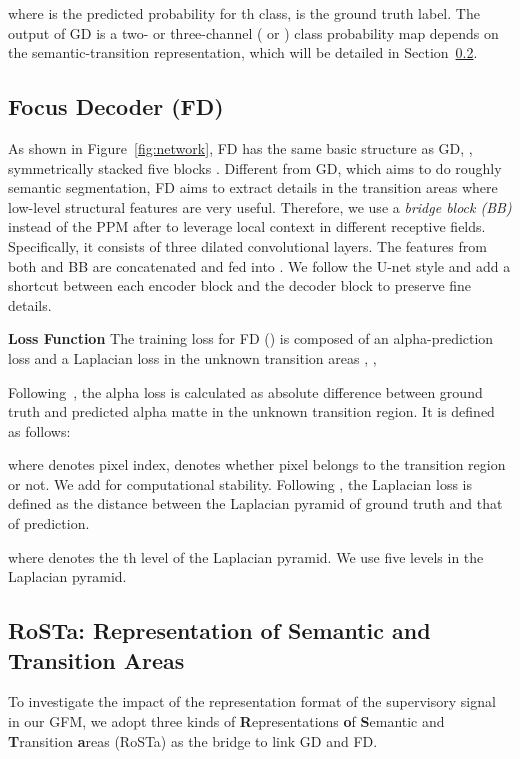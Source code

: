 \documentclass[twocolumn]{svjour3}
\begin{document}
where  is the predicted probability for th class,  is the ground truth label. The output of GD is a two- or three-channel ( or ) class probability map depends on the semantic-transition representation, which will be detailed in Section~\ref{section:data_presentation}.

\subsection{Focus Decoder (FD)}
As shown in Figure~\ref{fig:network}, FD has the same basic structure as GD, , symmetrically stacked five blocks . Different from GD, which aims to do roughly semantic segmentation, FD aims to extract details in the transition areas where low-level structural features are very useful. Therefore, we use a \textit{bridge block (BB)} \citep{Qin_2019_CVPR} instead of the PPM after  to leverage local context in different receptive fields. Specifically, it consists of three dilated convolutional layers. The features from both  and BB are concatenated and fed into . We follow the U-net \citep{ronneberger2015u} style and add a shortcut between each encoder block  and the decoder block  to preserve fine details.

\textbf{Loss Function} The training loss for FD () is composed of an alpha-prediction loss  and a Laplacian loss  in the unknown transition areas \citep{hou2019context}, ,

Following~\citep{xu2017deep}, the alpha loss  is calculated as absolute difference between ground truth  and predicted alpha matte  in the unknown transition region. It is defined as follows:

where  denotes pixel index,  denotes whether pixel  belongs to the transition region or not. We add  for computational stability. Following \citep{hou2019context}, the Laplacian loss  is defined as the  distance between the Laplacian pyramid of ground truth and that of prediction.

where  denotes the th level of the Laplacian pyramid. We use five levels in the Laplacian pyramid.



\subsection{RoSTa: Representation of Semantic and Transition Areas}
\label{section:data_presentation}
To investigate the impact of the representation format of the supervisory signal in our GFM, we adopt three kinds of \textbf{R}epresentations \textbf{o}f \textbf{S}emantic and \textbf{T}ransition \textbf{a}reas (RoSTa) as the bridge to link GD and FD.
\end{document}
